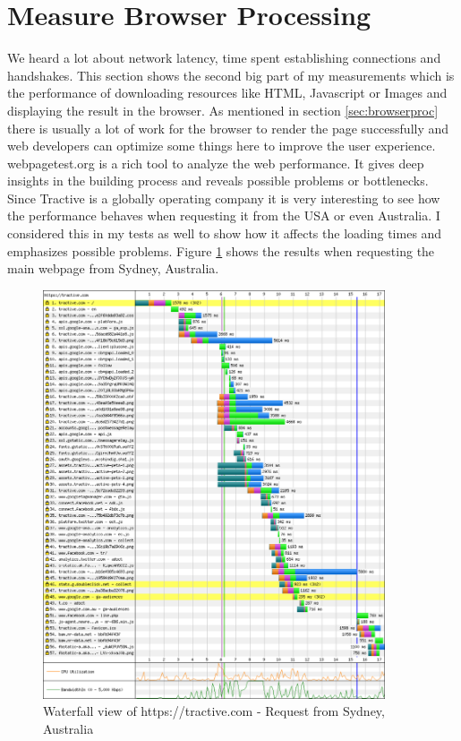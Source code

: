 \section{Measure Browser Processing}
\label{sec:browserProcessing}

We heard a lot about network latency, time spent establishing connections and handshakes. This section shows the second big part of my measurements which is the performance of downloading resources like HTML, Javascript or Images and displaying the result in the browser. As mentioned in section \ref{sec:browserproc} there is usually a lot of work for the browser to render the page successfully and web developers can optimize some things here to improve the user experience. webpagetest.org is a rich tool to analyze the web performance. It gives deep insights in the building process and reveals possible problems or bottlenecks. Since Tractive is a globally operating company it is very interesting to see how the performance behaves when requesting it from the USA or even Australia. I considered this in my tests as well to show how it affects the loading times and emphasizes possible problems. Figure \ref{fig:sydney_old} shows the results when requesting the main webpage from Sydney, Australia.

\begin{figure}[h!]
	\centering
		\includegraphics[width=0.9\textwidth]{imgs/webpagetest_old_sydney.png}
	\caption{Waterfall view of https://tractive.com - Request from Sydney, Australia}
	\label{fig:sydney_old}
\end{figure}

